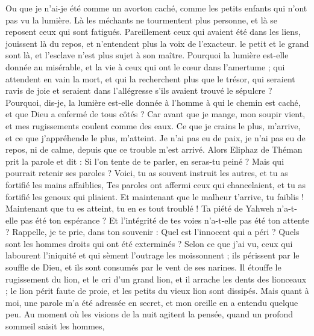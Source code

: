\begin{multicols}{2}
Ou que je n'ai-je été comme un avorton caché, comme les petits enfants qui n'ont pas vu la lumière.
Là les méchants ne tourmentent plus personne, et là se reposent ceux qui sont fatigués. 
Pareillement ceux qui avaient été dans les liens, jouissent là du repos, et n'entendent plus la voix de l'exacteur. 
le petit et le grand sont là, et l'esclave n'est plus sujet à son maître.
Pourquoi la lumière est-elle donnée au misérable, et la vie à ceux qui ont le cœur dans l'amertume ;
qui attendent en vain la mort, et qui la recherchent plus que le trésor,
qui seraient ravis de joie et seraient dans l'allégresse s'ils avaient trouvé le sépulcre ?
Pourquoi, dis-je, la lumière est-elle donnée à l'homme à qui le chemin est caché, et que Dieu a enfermé de tous côtés ?
Car avant que je mange, mon soupir vient, et mes rugissements coulent comme des eaux.
Ce que je crains le plus, m'arrive, et ce que j'appréhende le plus, m'atteint. 
Je n'ai pas eu de paix, je n'ai pas eu de repos, ni de calme, depuis que ce trouble m'est arrivé. 
\VerseOne{}Alors Eliphaz de Théman prit la parole et dit :
Si l'on tente de te parler, en seras-tu peiné ? Mais qui pourrait retenir ses paroles ?
Voici, tu as souvent instruit les autres, et tu as fortifié les mains affaiblies,
Tes paroles ont affermi ceux qui chancelaient, et tu as fortifié les genoux qui pliaient.
Et maintenant que le malheur t'arrive, tu faiblis ! Maintenant que tu es atteint, tu en es tout troublé !
 Ta piété de Yahweh n'a-t-elle pas été ton espérance ? Et l'intégrité de tes voies n'a-t-elle pas été ton attente ? 
Rappelle, je te prie, dans ton souvenir : Quel est l'innocent qui a péri ? Quels sont les hommes droits qui ont été exterminés ?
Selon ce que j'ai vu, ceux qui labourent l'iniquité et qui sèment l'outrage les moissonnent ;
ils périssent par le souffle de Dieu, et ils sont consumés par le vent de ses narines.
Il étouffe le rugissement du lion, et le cri d'un grand lion, et il arrache les dents des lionceaux ;
le lion périt faute de proie, et les petits du vieux lion sont dissipés.
Mais quant à moi, une parole m'a été adressée en secret, et mon oreille en a entendu quelque peu.
Au moment où les visions de la nuit agitent la pensée, quand un profond sommeil saisit les hommes,

\end{multicols}
